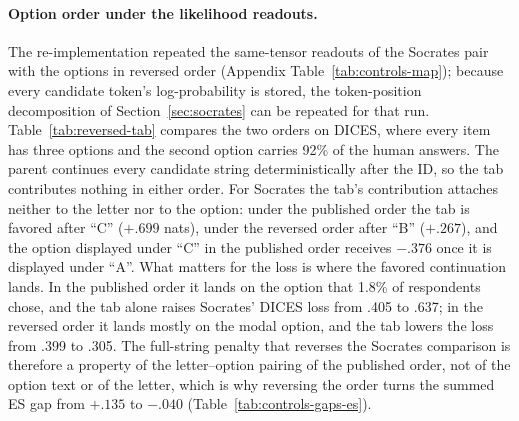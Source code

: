 \documentclass[11pt]{article}
\newcommand{\ES}{\textsc{ES}}
\begin{document}
\paragraph{Option order under the likelihood readouts.}
The re-implementation repeated the same-tensor readouts of the Socrates pair
with the options in reversed order (Appendix Table~\ref{tab:controls-map});
because every candidate token's log-probability is stored, the token-position
decomposition of Section~\ref{sec:socrates} can be repeated for that run.
Table~\ref{tab:reversed-tab} compares the two orders on DICES, where every
item has three options and the second option carries 92\% of the human
answers. The parent continues every candidate string deterministically after
the ID, so the tab contributes nothing in either order. For Socrates the tab's
contribution attaches neither to the letter nor to the option: under the
published order the tab is favored after ``C'' ($+.699$ nats), under the
reversed order after ``B'' ($+.267$), and the option displayed under ``C'' in
the published order receives $-.376$ once it is displayed under ``A''. What
matters for the loss is where the favored continuation lands. In the published
order it lands on the option that 1.8\% of respondents chose, and the tab
alone raises Socrates' DICES loss from .405 to .637; in the reversed order it
lands mostly on the modal option, and the tab lowers the loss from .399 to
.305. The full-string penalty that reverses the Socrates comparison is
therefore a property of the letter--option pairing of the published order,
not of the option text or of the letter, which is why reversing the order
turns the summed \ES{} gap from $+.135$ to $-.040$
(Table~\ref{tab:controls-gaps-es}).


\end{document}
